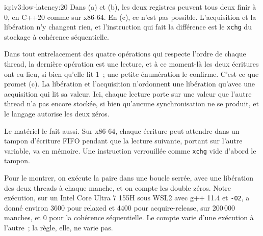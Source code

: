 \begin{solution}{iq:iv3:low-latency:20}
Dans (a) et (b), les deux registres peuvent tous deux finir à 0, en C++20 comme sur x86-64. En (c), ce n'est pas possible. L'acquisition et la libération n'y changent rien, et l'instruction qui fait la différence est le \texttt{xchg} du stockage à cohérence séquentielle.

Dans tout entrelacement des quatre opérations qui respecte l'ordre de chaque thread, la dernière opération est une lecture, et à ce moment-là les deux écritures ont eu lieu, si bien qu'elle lit 1~; une petite énumération le confirme. C'est ce que promet (c). La libération et l'acquisition n'ordonnent une libération qu'avec une acquisition qui lit sa valeur. Ici, chaque lecture porte sur une valeur que l'autre thread n'a pas encore stockée, si bien qu'aucune synchronisation ne se produit, et le langage autorise les deux zéros.

Le matériel le fait aussi. Sur x86-64, chaque écriture peut attendre dans un tampon d'écriture FIFO pendant que la lecture suivante, portant sur l'autre variable, va en mémoire. Une instruction verrouillée comme \texttt{xchg} vide d'abord le tampon.

Pour le montrer, on exécute la paire dans une boucle serrée, avec une libération des deux threads à chaque manche, et on compte les double zéros. Notre exécution, sur un Intel Core Ultra 7 155H sous WSL2 avec g++ 11.4 et \texttt{-O2}, a donné environ 3600 pour relaxed et 4400 pour acquire-release, sur 200\,000 manches, et 0 pour la cohérence séquentielle. Le compte varie d'une exécution à l'autre~; la règle, elle, ne varie pas.

\end{solution}

